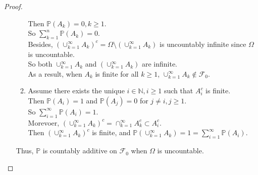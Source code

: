 \documentclass{article}
\newcommand{\bbp}{\mathbb{P}}
\newcommand{\bbn}{\mathbb{N}}
\newcommand{\llf}{\mathcal{F}}
\begin{document}
\begin{proof}
\begin{enumerate}[(a)]
\begin{enumerate}[(1)]
				Then $\bbp(A_k) = 0, k \geq 1$.\\
				So $\sum_{k=1}^n \bbp (A_k) = 0$.\\
				Besides, $(\cup_{k=1}^{\infty} A_k)^c = \Omega\setminus(\cup_{k=1}^{\infty} A_k)$ is uncountably infinite since $\Omega$ is uncountable.\\
				So both $\cup_{k=1}^{\infty} A_k$ and $(\cup_{k=1}^{\infty} A_k)$ are infinite.\\
				As a result, when $A_k$ is finite for all $k \geq 1$, $\cup_{k=1}^{\infty} A_k \not\in \llf_0$. 
			\item 
			Assume there exists the unique $i \in \bbn, i \geq 1$ such that $A_i^c$ is finite.\\
            Then $\bbp(A_i) = 1$ and $\bbp(A_j) = 0$ for $j \neq i, j \geq 1$.\\
            So $\sum_{i=1}^{\infty}\bbp(A_i) = 1.$ \\
			Morevoer, $(\cup_{k=1}^{\infty} A_k)^c  = \cap_{k=1}^{\infty} A_k^c \subset A_i^c $.\\
            Then $(\cup_{k=1}^{\infty} A_k)^c$ is finite, and $\bbp(\cup_{k=1}^{\infty} A_k) = 1 = \sum_{i=1}^{\infty}\bbp(A_i).$ 
		\end{enumerate}
        Thus, $\bbp$ is countably additive on $\llf_0$ when $\Omega$ is uncountable.
	\end{enumerate}
	\end{proof}
\end{document}
